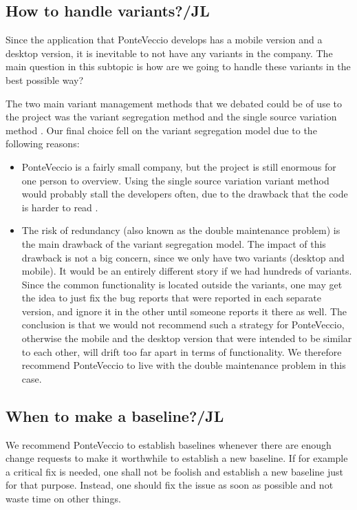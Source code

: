 \documentclass[10pt]{article}
\begin{document}
\subsection{How to handle variants?/JL}
Since the application that PonteVeccio develops has a mobile version and a desktop version, it is inevitable to not have any variants in the company. The main question in this subtopic is how are we going to handle these variants in the best possible way?

\noindent The two main variant management methods that we debated could be of use to the project was the variant segregation method and the single source variation method \cite{Mahler}. Our final choice fell on the variant segregation model due to the following reasons:
\begin{itemize}
\item PonteVeccio is a fairly small company, but the project is still enormous for one person to overview. Using the single source variation variant method would probably stall the developers often, due to the drawback that the code is harder to read \cite{Mahler}.
\item The risk of redundancy (also known as the double maintenance problem\cite{Babich}) is the main drawback of the variant segregation model\cite{Mahler}. The impact of this drawback is not a big concern, since we only have two variants (desktop and mobile). It would be an entirely different story if we had hundreds of variants. Since the common functionality is located outside the variants, one may get the idea to just fix the bug reports that were reported in each separate version, and ignore it in the other until someone reports it there as well. The conclusion is that we would not recommend such a strategy for PonteVeccio, otherwise the mobile and the desktop version that were intended to be similar to each other, will drift too far apart in terms of functionality. We therefore recommend PonteVeccio to live with the double maintenance problem in this case.

\end{itemize}
\noindent
\subsection{When to make a baseline?/JL}
We recommend PonteVeccio to establish baselines whenever there are enough change requests to make it worthwhile to establish a new baseline. If for example a critical fix is needed, one shall not be foolish and establish a new baseline just for that purpose. Instead, one should fix the issue as soon as possible and not waste time on other things. 
\end{document}
